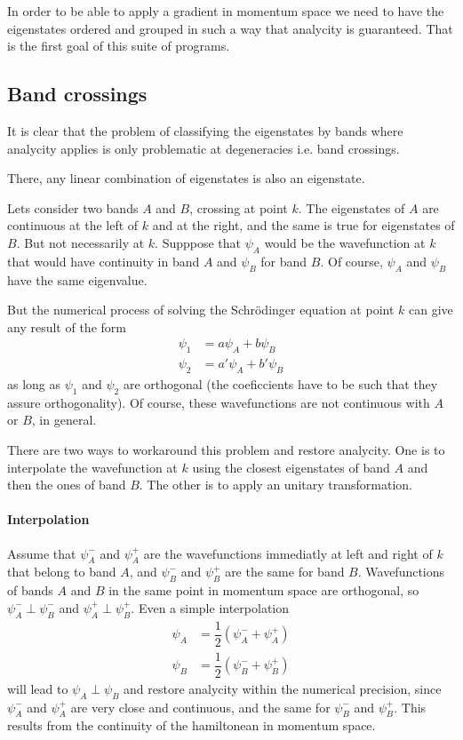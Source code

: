 \documentclass[a4paper,12pt]{report}
\begin{document}
In order to be able to apply a gradient in momentum space we need to have the eigenstates ordered and grouped
in such a way that analycity is guaranteed.
That is the first goal of this suite of programs.



\subsection*{Band crossings}\label{ssec:bandcrossings}

It is clear that the problem of classifying the eigenstates by bands where analycity applies is
only problematic at degeneracies i.e. band crossings.

There, any linear combination of eigenstates is also an eigenstate.

Lets consider two bands $A$ and $B$, crossing at point $k$.
The eigenstates of $A$ are continuous at the left of $k$ and at the right, and the same is true for eigenstates of $B$.
But not necessarily at $k$.
Supppose that $\psi_A$ would be the wavefunction at $k$ that would have continuity in band $A$
and $\psi_B$ for band $B$. Of course, $\psi_A$ and $\psi_B$ have the same eigenvalue.

But the numerical process of solving the Schr\"odinger equation at point $k$ can give any result of the form
\begin{align}
 \psi_1 &= a\psi_A + b\psi_B \\
 \psi_2 &= a'\psi_A + b'\psi_B
\end{align}
as long as $\psi_1$ and $\psi_2$ are orthogonal (the coeficcients have to be such that they assure orthogonality).
Of course, these wavefunctions are not continuous with $A$ or $B$, in general.

There are two ways to workaround this problem and restore analycity.
One is to interpolate the wavefunction at $k$ using the closest eigenstates of band $A$ and then the ones of band $B$.
The other is to apply an unitary transformation.

\paragraph*{Interpolation}
Assume that $\psi_A^-$ and $\psi_A^+$ are the wavefunctions immediatly at left and right of $k$ that belong to band $A$,
and $\psi_B^-$ and $\psi_B^+$ are the same for band $B$.
Wavefunctions of bands $A$ and $B$ in the same point in momentum space are orthogonal, so $\psi_A^- \perp \psi_B^-$
and $\psi_A^+ \perp \psi_B^+$.
Even a simple interpolation
\begin{align}
 \psi_A &= \dfrac{1}{2}\left( \psi_A^- + \psi_A^+\right) \\
 \psi_B &= \dfrac{1}{2}\left( \psi_B^- + \psi_B^+\right)
\end{align}
will lead to $\psi_A \perp \psi_B$ and restore analycity within the numerical precision,
since $\psi_A^-$ and $\psi_A^+$ are very close and continuous,
and the same for $\psi_B^-$ and $\psi_B^+$.
This results from the continuity of the hamiltonean in momentum space.
\end{document}
